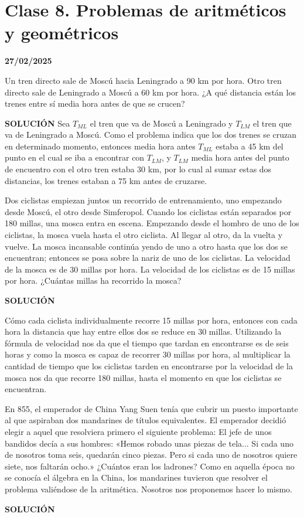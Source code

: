 \chapter{Clase 8. Problemas de aritméticos y geométricos}
\textbf{27/02/2025}


\begin{excercise}
    Un tren directo sale de Moscú hacia Leningrado a 90 km por hora. Otro tren directo sale de Leningrado a Moscú a 60 km por hora. ¿A qué distancia están los trenes entre sí media hora antes de que se crucen?
\end{excercise}
\textbf{SOLUCIÓN}
Sea $T_{ML}$ el tren que va de Moscú a Leningrado y $T_{LM}$ el tren que va de Leningrado a Moscú.
Como el problema indica que los dos trenes se cruzan en determinado momento, entonces media hora antes $T_{ML}$ estaba a 45 km del punto en el cual se iba a encontrar con $T_{LM}$, y $T_{LM}$ media hora antes del punto de encuentro con el otro tren estaba 30 km, por lo cual al sumar estas dos distancias, los trenes estaban a 75 km antes de cruzarse. 

\begin{excercise}
    Dos ciclistas empiezan juntos un recorrido de entrenamiento, uno empezando desde Moscú, el otro desde Simferopol. Cuando los ciclistas están separados por 180 millas, una mosca entra en escena. Empezando desde el hombro de uno de los ciclistas, la mosca vuela hasta el otro ciclista. Al llegar al otro, da la vuelta y vuelve. La mosca incansable continúa yendo de uno a otro hasta que los dos se encuentran; entonces se posa sobre la nariz de uno de los ciclistas.
    La velocidad de la mosca es de 30 millas por hora. La velocidad de los ciclistas es de 15 millas por hora. ¿Cuántas millas ha recorrido la mosca?
\end{excercise}
\textbf{SOLUCIÓN}

Cómo cada ciclista individualmente recorre 15 millas por hora, entonces con cada hora la distancia que hay entre ellos dos se reduce en 30 millas. Utilizando la fórmula de velocidad nos da que el tiempo que tardan en encontrarse es de seis horas y como la mosca es capaz de recorrer 30 millas por hora, al multiplicar la cantidad de tiempo que los ciclistas tarden en encontrarse por la velocidad de la mosca nos da que recorre 180 millas, hasta el momento en que los ciclistas se encuentran.

\begin{excercise}
    En 855, el emperador de China Yang Suen tenía que cubrir un puesto importante al que aspiraban dos mandarines de títulos equivalentes. El emperador decidió elegir a aquel que resolviera primero el siguiente problema:
    El jefe de unos bandidos decía a sus hombres: «Hemos robado unas piezas de tela... Si cada uno de nosotros toma seis, quedarán cinco piezas. Pero si cada uno de nosotros quiere siete, nos faltarán ocho.» ¿Cuántos eran los ladrones?
    Como en aquella época no se conocía el álgebra en la China, los mandarines tuvieron que resolver el problema valiéndose de la aritmética. Nosotros nos proponemos hacer lo mismo.
\end{excercise}
\textbf{SOLUCIÓN}

